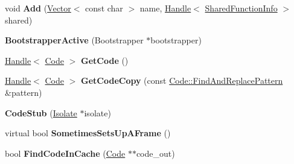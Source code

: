 \begin{DoxyCompactItemize}
\item 
\hypertarget{classv8_1_1internal_1_1_b_a_s_e___e_m_b_e_d_d_e_d_ab396dba36d09233198da2ed532d75694}{}void {\bfseries Add} (\hyperlink{classv8_1_1internal_1_1_vector}{Vector}$<$ const char $>$ name, \hyperlink{classv8_1_1internal_1_1_handle}{Handle}$<$ \hyperlink{classv8_1_1internal_1_1_shared_function_info}{Shared\+Function\+Info} $>$ shared)\label{classv8_1_1internal_1_1_b_a_s_e___e_m_b_e_d_d_e_d_ab396dba36d09233198da2ed532d75694}

\item 
\hypertarget{classv8_1_1internal_1_1_b_a_s_e___e_m_b_e_d_d_e_d_ace40f6857afa9c64ee18baef4cd77375}{}{\bfseries Bootstrapper\+Active} (Bootstrapper $\ast$bootstrapper)\label{classv8_1_1internal_1_1_b_a_s_e___e_m_b_e_d_d_e_d_ace40f6857afa9c64ee18baef4cd77375}

\item 
\hypertarget{classv8_1_1internal_1_1_b_a_s_e___e_m_b_e_d_d_e_d_ac7064d45a7a1b9de2538c20da2b4ac4b}{}\hyperlink{classv8_1_1internal_1_1_handle}{Handle}$<$ \hyperlink{classv8_1_1internal_1_1_code}{Code} $>$ {\bfseries Get\+Code} ()\label{classv8_1_1internal_1_1_b_a_s_e___e_m_b_e_d_d_e_d_ac7064d45a7a1b9de2538c20da2b4ac4b}

\item 
\hypertarget{classv8_1_1internal_1_1_b_a_s_e___e_m_b_e_d_d_e_d_a2dd99eccac7dd4910b2dd3db0c7c1242}{}\hyperlink{classv8_1_1internal_1_1_handle}{Handle}$<$ \hyperlink{classv8_1_1internal_1_1_code}{Code} $>$ {\bfseries Get\+Code\+Copy} (const \hyperlink{classv8_1_1internal_1_1_code_1_1_find_and_replace_pattern}{Code\+::\+Find\+And\+Replace\+Pattern} \&pattern)\label{classv8_1_1internal_1_1_b_a_s_e___e_m_b_e_d_d_e_d_a2dd99eccac7dd4910b2dd3db0c7c1242}

\item 
\hypertarget{classv8_1_1internal_1_1_b_a_s_e___e_m_b_e_d_d_e_d_a2d87f79a8709398a18df1a9963ed1295}{}{\bfseries Code\+Stub} (\hyperlink{classv8_1_1internal_1_1_isolate}{Isolate} $\ast$isolate)\label{classv8_1_1internal_1_1_b_a_s_e___e_m_b_e_d_d_e_d_a2d87f79a8709398a18df1a9963ed1295}

\item 
\hypertarget{classv8_1_1internal_1_1_b_a_s_e___e_m_b_e_d_d_e_d_ae6aba92227693567f5b567831f50f440}{}virtual bool {\bfseries Sometimes\+Sets\+Up\+A\+Frame} ()\label{classv8_1_1internal_1_1_b_a_s_e___e_m_b_e_d_d_e_d_ae6aba92227693567f5b567831f50f440}

\item 
\hypertarget{classv8_1_1internal_1_1_b_a_s_e___e_m_b_e_d_d_e_d_a2ff99eda7f7b44a4f7eb3b4fcfa95bbe}{}bool {\bfseries Find\+Code\+In\+Cache} (\hyperlink{classv8_1_1internal_1_1_code}{Code} $\ast$$\ast$code\+\_\+out)\label{classv8_1_1internal_1_1_b_a_s_e___e_m_b_e_d_d_e_d_a2ff99eda7f7b44a4f7eb3b4fcfa95bbe}


\end{DoxyCompactItemize}
